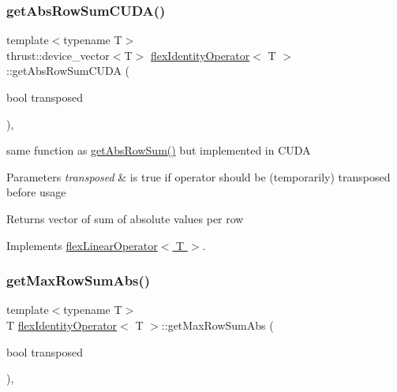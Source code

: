 \subsubsection{\texorpdfstring{get\+Abs\+Row\+Sum\+C\+U\+D\+A()}{getAbsRowSumCUDA()}}
{\footnotesize\ttfamily template$<$typename T$>$ \\
thrust\+::device\+\_\+vector$<$T$>$ \hyperlink{classflex_identity_operator}{flex\+Identity\+Operator}$<$ T $>$\+::get\+Abs\+Row\+Sum\+C\+U\+DA (\begin{DoxyParamCaption}\item[{bool}]{transposed }\end{DoxyParamCaption})\hspace{0.3cm}{\ttfamily [inline]}, {\ttfamily [virtual]}}



same function as \hyperlink{classflex_identity_operator_afe7f2f91fc5f563c2261937f272c0255}{get\+Abs\+Row\+Sum()} but implemented in C\+U\+DA 


\begin{DoxyParams}{Parameters}
{\em transposed} & is true if operator should be (temporarily) transposed before usage \\
\hline
\end{DoxyParams}
\begin{DoxyReturn}{Returns}
vector of sum of absolute values per row 
\end{DoxyReturn}


Implements \hyperlink{classflex_linear_operator_a0a0a431d43f4f9d36cbee0d31ba5a29b}{flex\+Linear\+Operator$<$ T $>$}.

\mbox{\label{classflex_identity_operator_ac9127077af24910e90eb0239a2508306}} 
\subsubsection{\texorpdfstring{get\+Max\+Row\+Sum\+Abs()}{getMaxRowSumAbs()}}
{\footnotesize\ttfamily template$<$typename T$>$ \\
T \hyperlink{classflex_identity_operator}{flex\+Identity\+Operator}$<$ T $>$\+::get\+Max\+Row\+Sum\+Abs (\begin{DoxyParamCaption}\item[{bool}]{transposed }\end{DoxyParamCaption})\hspace{0.3cm}{\ttfamily [inline]}, {\ttfamily [virtual]}}



